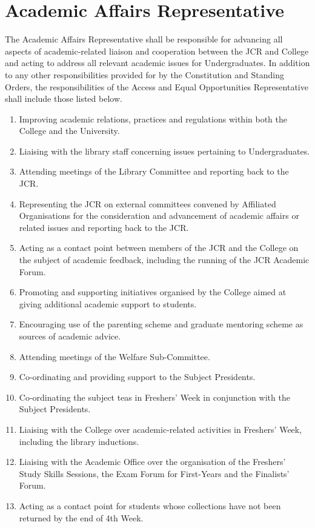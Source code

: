 \section{Academic Affairs Representative}
\npara The Academic Affairs Representative shall be responsible for advancing all aspects of academic-related liaison and cooperation between the JCR and College and acting to address all relevant academic issues for Undergraduates.  
\npara In addition to any other responsibilities provided for by the Constitution and Standing Orders, the responsibilities of the Access and Equal Opportunities Representative shall include those listed below.
\begin{enumerate}
	\item Improving academic relations, practices and regulations within both the College and the University.     
	\item Liaising with the library staff concerning issues pertaining to Undergraduates.
	\item Attending meetings of the Library Committee and reporting back to the JCR.
	\item Representing the JCR on external committees convened by Affiliated Organisations for the consideration and advancement of academic affairs or related issues and reporting back to the JCR.     
	\item Acting as a contact point between members of the JCR and the College on the subject of academic feedback, including the running of the JCR Academic Forum.
	\item Promoting and supporting initiatives organised by the College aimed at giving additional academic support to students.     
	\item Encouraging use of the parenting scheme and graduate mentoring scheme as sources of academic advice.     
	\item Attending meetings of the Welfare Sub-Committee.     
	\item Co-ordinating and providing support to the Subject Presidents.     
	\item Co-ordinating the subject teas in Freshers' Week in conjunction with the Subject Presidents.
	\item Liaising with the College over academic-related activities in Freshers' Week, including the library inductions.
	\item Liaising with the Academic Office over the organisation of the Freshers' Study Skills Sessions, the Exam Forum for First-Years and the Finalists' Forum.
	\item Acting as a contact point for students whose collections have not been returned by the end of 4th Week.     

\end{enumerate}

